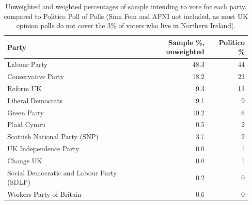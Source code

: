 \begin{table}[ht]
\centering
\begin{tabular}{lrr}
  \hline
Party & Sample \%, unweighted & Politico \% \\ 
  \hline
Labour Party & 48.3 & 44 \\ 
  Conservative Party & 18.2 & 23 \\ 
  Reform UK & 9.3 & 13 \\ 
  Liberal Democrats & 9.1 &  9 \\ 
  Green Party & 10.2 &  6 \\ 
  Plaid Cymru & 0.5 &  2 \\ 
  Scottish National Party (SNP) & 3.7 &  2 \\ 
  UK Independence Party & 0.0 &  1 \\ 
  Change UK & 0.0 &  1 \\ 
  Social Democratic and Labour Party (SDLP) & 0.2 &  0 \\ 
  Workers Party of Britain & 0.6 &  0 \\ 
   \hline
\end{tabular}
\caption{Unweighted and weighted percentages of sample intending to vote for each
                   party, compared to Politico Poll of Polls (Sinn Fein and APNI not included, as most
                   UK opinion polls do not cover the 3\% of voters who live in Northern Ireland).} 
\label{tab:votingintention2}
\end{table}
